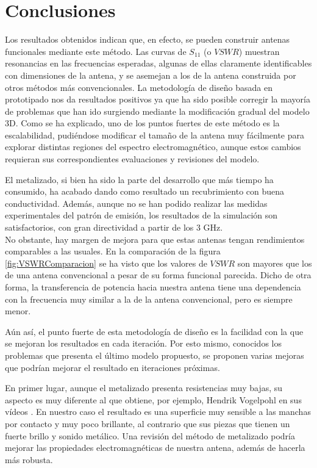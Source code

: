 \documentclass[11pt,a4paper,twoside,pdf]{article}
\numberwithin{equation}{section}
\begin{document}
\section{Conclusiones}

Los resultados obtenidos indican que, en efecto, se pueden construir antenas funcionales mediante este método. Las curvas de $S_{11}$ (o $VSWR$) muestran resonancias en las frecuencias esperadas, algunas de ellas claramente identificables con dimensiones de la antena, y se asemejan a los de la antena construida por otros métodos más convencionales. La metodología de diseño basada en prototipado nos da resultados positivos ya que ha sido posible corregir la mayoría de problemas que han ido surgiendo mediante la modificación gradual del modelo 3D. Como se ha explicado, uno de los puntos fuertes de este método es la escalabilidad, pudiéndose modificar el tamaño de la antena muy fácilmente para explorar distintas regiones del espectro electromagnético, aunque estos cambios requieran sus correspondientes evaluaciones y revisiones del modelo.

El metalizado, si bien ha sido la parte del desarrollo que más tiempo ha consumido, ha acabado dando como resultado un recubrimiento con buena conductividad. Además, aunque no se han podido realizar las medidas experimentales del patrón de emisión, los resultados de la simulación son satisfactorios, con gran directividad a partir de los 3 GHz.\\

No obstante, hay margen de mejora para que estas antenas tengan rendimientos comparables a las usuales. En la comparación de la figura \ref{fig:VSWRComparacion} se ha visto que los valores de $VSWR$ son mayores que los de una antena convencional a pesar de su forma funcional parecida. Dicho de otra forma, la transferencia de potencia hacia nuestra antena tiene una dependencia con la frecuencia muy similar a la de la antena convencional, pero es siempre menor. 

Aún así, el punto fuerte de esta metodología de diseño es la facilidad con la que se mejoran los resultados en cada iteración. Por esto mismo, conocidos los problemas que presenta el último modelo propuesto, se proponen varias mejoras que podrían mejorar el resultado en iteraciones próximas. 

En primer lugar, aunque el metalizado presenta resistencias muy bajas, su aspecto es muy diferente al que obtiene, por ejemplo, Hendrik Vogelpohl en sus vídeos \cite{hen3drik}. En nuestro caso el resultado es una superficie muy sensible a las manchas por contacto y muy poco brillante, al contrario que sus piezas que tienen un fuerte brillo y sonido metálico. Una revisión del método de metalizado podría mejorar las propiedades electromagnéticas de nuestra antena, además de hacerla más robusta. 
\end{document}
